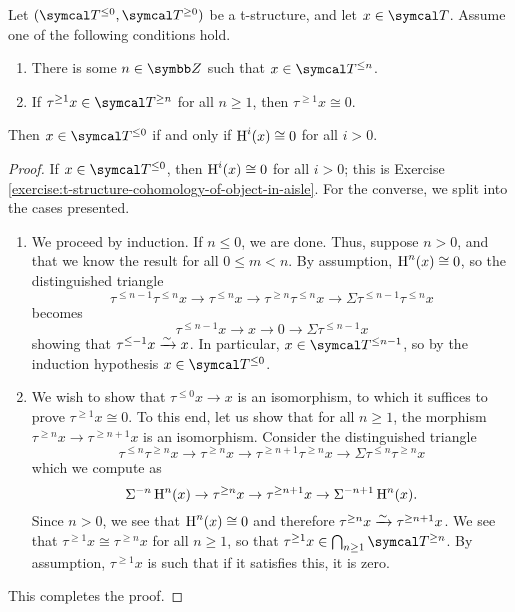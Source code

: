 \begin{proposition}\label{prop:t-structure-aisle-from-cohomology}
	Let \((\calT^{\leq 0},\calT^{\geq 0})\) be a t-structure, and let \(x\in\calT\). Assume one of the following conditions hold.
	\begin{enumerate}[label=(\roman*)]
		\item There is some \(n\in\Z\) such that \(x\in\calT^{\leq n}\).
		\item If \(\tau^{\geq 1}x \in \calT^{\geq n} \) for all \(n\geq 1\), then \(\tau^{\geq 1}x\cong 0\).
	\end{enumerate}
	Then \(x\in\calT^{\leq 0}\) if and only if \(\operatorname{H}^i(x)\cong 0\) for all \(i > 0\).
\end{proposition}
\begin{proof}
If \(x\in\calT^{\leq 0}\), then \(\operatorname{H}^i(x)\cong 0\) for all \(i>0\); this is Exercise \ref{exercise:t-structure-cohomology-of-object-in-aisle}. For the converse, we split into the cases presented.
\begin{enumerate}[label=(\roman*)]
	\item We proceed by induction. If \(n\leq 0\), we are done. Thus, suppose \(n > 0\), and that we know the result for all \(0 \leq m < n\). By assumption, \(\operatorname{H}^n(x) \cong 0\), so the distinguished triangle
	\[ \tau^{\leq n-1}\tau^{\leq n}x \to \tau^{\leq n}x \to \tau^{\geq n}\tau^{\leq n}x \to \Sigma \tau^{\leq n-1}\tau^{\leq n}x \]
	becomes
	\[ \tau^{\leq n-1}x \to x \to 0 \to \Sigma\tau^{\leq n-1}x \]
	showing that \(\tau^{\leq -1}x\xrightarrow{\sim} x\). In particular, \(x\in\calT^{\leq n-1}\), so by the induction hypothesis \(x\in\calT^{\leq 0}\).
	\item We wish to show that \(\tau^{\leq 0}x \to x\) is an isomorphism, to which it suffices to prove \(\tau^{\geq 1}x\cong 0\). To this end, let us show that for all \(n \geq 1\),
	the morphism \(\tau^{\geq n}x \to \tau^{\geq n+1}x\) is an isomorphism. Consider the distinguished triangle
	\[ \tau^{\leq n}\tau^{\geq n}x \to \tau^{\geq n}x \to \tau^{\geq n+1}\tau^{\geq n}x \to \Sigma\tau^{\leq n}\tau^{\geq n}x \]
	which we compute as
	\[ \Sigma^{-n}\operatorname{H}^n(x) \to \tau^{\geq n}x \to \tau^{\geq n+1}x \to \Sigma^{-n+1}\operatorname{H}^n(x). \]
	Since \(n>0\), we see that \(\operatorname{H}^n(x)\cong 0\) and therefore \(\tau^{\geq n}x\xrightarrow{\sim}\tau^{\geq n+1}x\). We see that \(\tau^{\geq 1}x\cong \tau^{\geq n}x\) for all \(n\geq 1\),
	so that \(\tau^{\geq 1}x \in \bigcap_{n\geq 1}\calT^{\geq n}\). By assumption, \(\tau^{\geq 1}x\) is such that if it satisfies this, it is zero.
\end{enumerate}
This completes the proof.
\end{proof}

